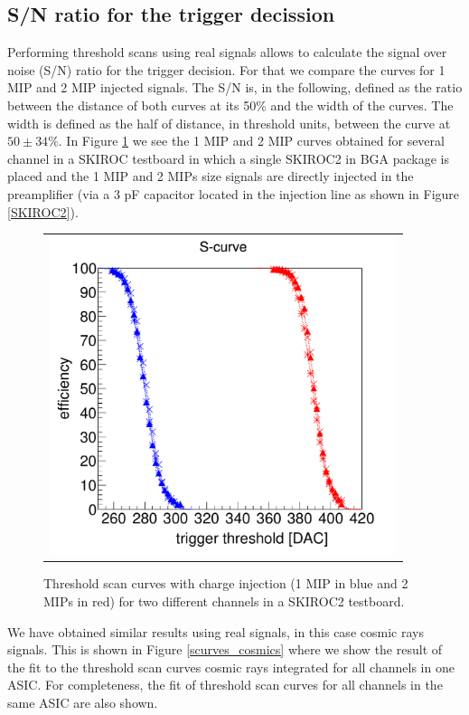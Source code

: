 \documentclass[a4paper,11pt]{article}
\begin{document}
\subsection{S/N ratio for the trigger decission}
\label{sec:comm_trigger_sn}

Performing threshold scans using
real signals allows to calculate the signal over noise (S/N) ratio
for the trigger decision.
For that we compare the curves for 1 MIP and 2 MIP injected signals.
The S/N is, in the following, defined as the ratio between the distance of both curves at its
50\% and the width of the curves. The width is defined as the half of distance, in threshold units, between the
curve at $50\pm34\%$.
In Figure \ref{scurves_injection} we see the 1 MIP and 2 MIP curves obtained for several channel
in a SKIROC testboard in which a single SKIROC2 in BGA package is placed and the 1 MIP and 2 MIPs 
size signals are directly injected in the preamplifier 
(via a 3 pF capacitor located in the injection line as shown in Figure \ref{SKIROC2}). 


\begin{figure}[!t]
    \centering
  \begin{tabular}{l}
	\includegraphics[width=4in]{scurve_pp_fastshaper_ch_DAC-eps-converted-to.pdf} \\
	\end{tabular}
\caption{Threshold scan curves with charge injection (1 MIP in blue and 2 MIPs in red) for two different channels in a SKIROC2 testboard.}
\label{scurves_injection}
\end{figure}


We have obtained similar results using real signals, in this case cosmic rays signals. This is shown 
in Figure \ref{scurves_cosmics}  where 
we show the result of the fit to the threshold scan curves cosmic rays integrated for all channels
in one ASIC. For completeness, the fit of threshold scan curves for all channels
in the same ASIC are also shown.
\end{document}
